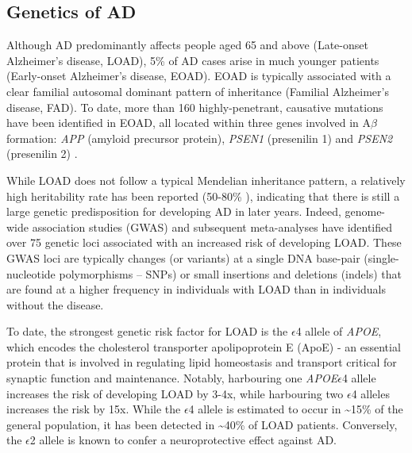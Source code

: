 \newpage
\subsection{Genetics of AD}
Although AD predominantly affects people aged 65 and above (Late-onset Alzheimer’s disease, LOAD), 5\% of AD cases arise in much younger patients (Early-onset Alzheimer’s disease, EOAD). EOAD is typically associated with a clear familial autosomal dominant pattern of inheritance (Familial Alzheimer’s disease, FAD)\cite{Jarmolowicz2015}. To date, more than 160 highly-penetrant, causative mutations have been identified in EOAD, all located within three genes involved in A$\beta$ formation: \textit{APP} (amyloid precursor protein), \textit{PSEN1} (presenilin 1) and \textit{PSEN2} (presenilin 2) \cite{LM2010,Chai2007}. %

While LOAD does not follow a typical Mendelian inheritance pattern, a relatively high heritability rate has been reported (50-80\% \cite{Gatz2006}), indicating that there is still a large genetic predisposition for developing AD in later years. Indeed, genome-wide association studies (GWAS) and subsequent meta-analyses \cite{Bellenguez2020,Naj2020,Kunkle2019,Jansen2019,Lambert2013,Naj2011,Hollingworth2011,Harold2009,Lambert2009,Bertram2008} have identified over 75 genetic loci associated with an increased risk of developing LOAD. These GWAS loci are typically changes (or variants) at a single DNA base-pair (single-nucleotide polymorphisms – SNPs) or small insertions and deletions (indels) that are found at a higher frequency in individuals with LOAD than in individuals without the disease. 

To date, the strongest genetic risk factor for LOAD is the $\epsilon$4 allele of \textit{APOE}\cite{Lambert2013}, which encodes the cholesterol transporter apolipoprotein E (ApoE) - an essential protein that is involved in regulating lipid homeostasis and transport critical for synaptic function and maintenance\cite{DH2001}. Notably, harbouring one \textit{APOE}$\epsilon$4 allele increases the risk of developing LOAD by 3-4x, while harbouring two $\epsilon$4 alleles increases the risk by 15x\cite{Farrer1997}. While the $\epsilon$4 allele is estimated to occur in \textasciitilde 15\% of the general population, it has been detected in \textasciitilde40\% of LOAD patients\cite{Farrer1997}. Conversely, the $\epsilon$2 allele is known to confer a neuroprotective effect against AD\cite{Nagy1995,EH1994}. 

